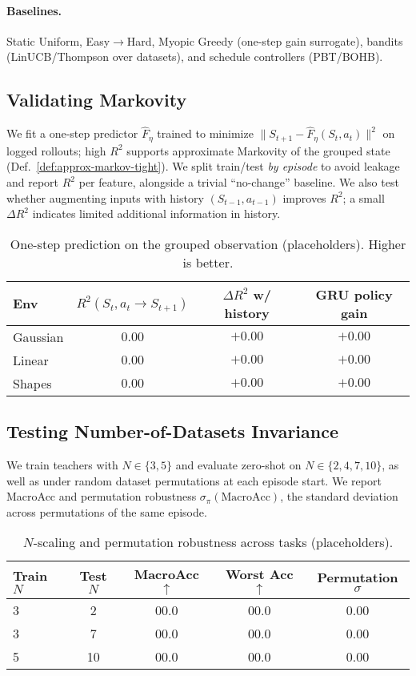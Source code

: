 \documentclass[11pt]{article}
\newcommand{\MacroAcc}{\mathrm{MacroAcc}}
\newcommand{\1}{\mathbf{1}}
\begin{document}
\paragraph{Baselines.}
Static Uniform, Easy$\to$Hard, Myopic Greedy (one-step gain surrogate), bandits (LinUCB/Thompson over datasets), and schedule controllers (PBT/BOHB).

\subsection{Validating Markovity}\label{sec:markov-exp}
We fit a one-step predictor $\hat{F}_\eta$ trained to minimize $\|S_{t+1}-\hat{F}_\eta(S_t,a_t)\|^2$ on logged rollouts; high $R^2$ supports approximate Markovity of the grouped state (Def.~\ref{def:approx-markov-tight}).
We split train/test \emph{by episode} to avoid leakage and report $R^2$ per feature, alongside a trivial ``no-change'' baseline.
We also test whether augmenting inputs with history $(S_{t-1},a_{t-1})$ improves $R^2$; a small $\Delta R^2$ indicates limited additional information in history.
\begin{table}[H]
\centering
\caption{One-step prediction on the grouped observation (placeholders). Higher is better.}
\label{tab:markov}
\begin{tabular}{lccc}
\toprule
Env & $R^2(S_t,a_t\!\to\!S_{t+1})$ & $\Delta R^2$ w/ history & GRU policy gain \\
\midrule
Gaussian & $0.00$ & $+0.00$ & $+0.00$ \\
Linear & $0.00$ & $+0.00$ & $+0.00$ \\
Shapes & $0.00$ & $+0.00$ & $+0.00$ \\
\bottomrule
\end{tabular}
\end{table}

\subsection{Testing Number-of-Datasets Invariance}
We train teachers with $N\in\{3,5\}$ and evaluate zero-shot on $N\in\{2,4,7,10\}$, as well as under random dataset permutations at each episode start.
We report MacroAcc and permutation robustness $\sigma_\pi(\MacroAcc)$, the standard deviation across permutations of the same episode.
\begin{table}[H]
\centering
\caption{$N$-scaling and permutation robustness across tasks (placeholders).}
\label{tab:ninvariance}
\begin{tabular}{lcccc}
\toprule
Train $N$ & Test $N$ & MacroAcc $\uparrow$ & Worst Acc $\uparrow$ & Permutation $\sigma$ \\
\midrule
3 & 2 & 00.0 & 00.0 & 0.00 \\
3 & 7 & 00.0 & 00.0 & 0.00 \\
5 & 10 & 00.0 & 00.0 & 0.00 \\
\bottomrule
\end{tabular}
\end{table}
\end{document}
